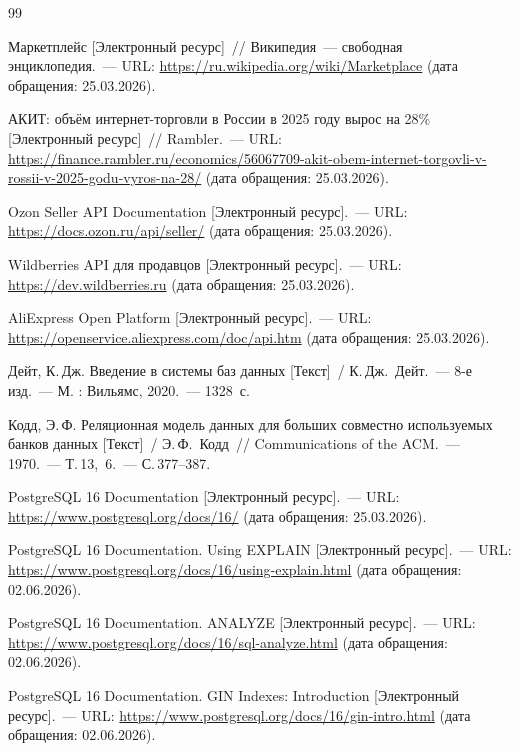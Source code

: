 
\begin{thebibliography}{99}
\sloppy

 Маркетплейс [Электронный ресурс]~// Википедия~--- свободная энциклопедия.~--- URL: \url{https://ru.wikipedia.org/wiki/Marketplace} (дата обращения: 25.03.2026).

 АКИТ: объём интернет-торговли в России в 2025 году вырос на 28\% [Электронный ресурс]~// Rambler.~--- URL: \url{https://finance.rambler.ru/economics/56067709-akit-obem-internet-torgovli-v-rossii-v-2025-godu-vyros-na-28/} (дата обращения: 25.03.2026).

 Ozon Seller API Documentation [Электронный ресурс].~--- URL: \url{https://docs.ozon.ru/api/seller/} (дата обращения: 25.03.2026).

 Wildberries API для продавцов [Электронный ресурс].~--- URL: \url{https://dev.wildberries.ru} (дата обращения: 25.03.2026).

 AliExpress Open Platform [Электронный ресурс].~--- URL: \url{https://openservice.aliexpress.com/doc/api.htm} (дата обращения: 25.03.2026).

 Дейт, К.\,Дж. Введение в системы баз данных [Текст]~/ К.\,Дж.~Дейт.~--- 8-е изд.~--- М. : Вильямс, 2020.~--- 1328~с.

 Кодд, Э.\,Ф. Реляционная модель данных для больших совместно используемых банков данных [Текст]~/ Э.\,Ф.~Кодд~// Communications of the ACM.~--- 1970.~--- Т.\,13, \textnumero\,6.~--- С.\,377--387.

 PostgreSQL 16 Documentation [Электронный ресурс].~--- URL: \url{https://www.postgresql.org/docs/16/} (дата обращения: 25.03.2026).

 PostgreSQL 16 Documentation. Using EXPLAIN [Электронный ресурс].~--- URL: \url{https://www.postgresql.org/docs/16/using-explain.html} (дата обращения: 02.06.2026).

 PostgreSQL 16 Documentation. ANALYZE [Электронный ресурс].~--- URL: \url{https://www.postgresql.org/docs/16/sql-analyze.html} (дата обращения: 02.06.2026).

 PostgreSQL 16 Documentation. GIN Indexes: Introduction [Электронный ресурс].~--- URL: \url{https://www.postgresql.org/docs/16/gin-intro.html} (дата обращения: 02.06.2026).


\end{thebibliography}
